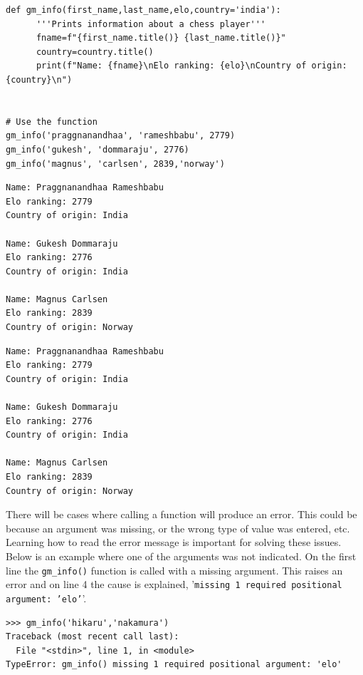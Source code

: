 \documentclass[10pt]{book}
\begin{document}
\label{org4962376}
\begin{verbatim}
def gm_info(first_name,last_name,elo,country='india'):
      '''Prints information about a chess player'''
      fname=f"{first_name.title()} {last_name.title()}"
      country=country.title()
      print(f"Name: {fname}\nElo ranking: {elo}\nCountry of origin: {country}\n")


# Use the function
gm_info('praggnanandhaa', 'rameshbabu', 2779)
gm_info('gukesh', 'dommaraju', 2776)
gm_info('magnus', 'carlsen', 2839,'norway')
\end{verbatim}

\label{org740afa4}
\begin{verbatim}
Name: Praggnanandhaa Rameshbabu
Elo ranking: 2779
Country of origin: India

Name: Gukesh Dommaraju
Elo ranking: 2776
Country of origin: India

Name: Magnus Carlsen
Elo ranking: 2839
Country of origin: Norway

\end{verbatim}

\label{orge0ab217}
\begin{verbatim}
Name: Praggnanandhaa Rameshbabu
Elo ranking: 2779
Country of origin: India

Name: Gukesh Dommaraju
Elo ranking: 2776
Country of origin: India

Name: Magnus Carlsen
Elo ranking: 2839
Country of origin: Norway

\end{verbatim}

There will be cases where calling a function will produce an error. This could be because an argument was missing, or the wrong type of value was entered, etc. Learning how to read the error message is important for solving these issues.
Below is an example where one of the arguments was not indicated. On the first line the \texttt{gm\_info()} function is called with a missing argument. This raises an error and on line 4 the cause is explained, '\texttt{missing 1 required positional argument: 'elo'}'.

\label{org2a734f9}
\begin{verbatim}
>>> gm_info('hikaru','nakamura')
Traceback (most recent call last):
  File "<stdin>", line 1, in <module>
TypeError: gm_info() missing 1 required positional argument: 'elo'
\end{verbatim}
\end{document}
